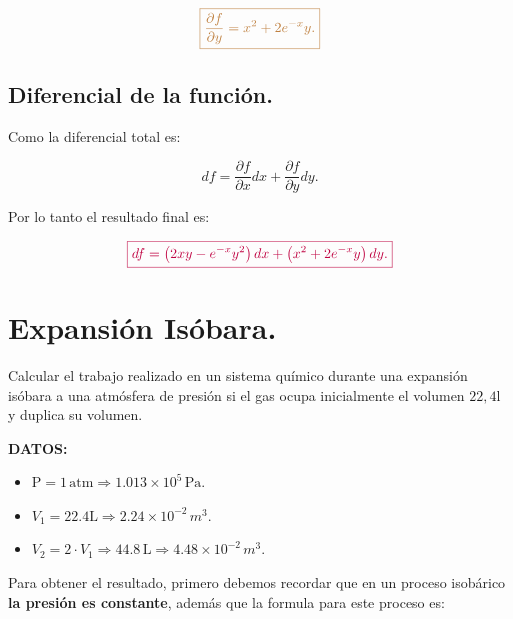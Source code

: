 \documentclass[a4paper,12pt]{article} %
\begin{document}
\vspace{\baselineskip}

\[ \textcolor{brown}{\boxed{ \frac{\partial f}{\partial y} = x^2 + 2 e^{-x}y. }} \]


\subsection{ Diferencial de la función. }

\begin{justify}
	Como la diferencial total es:
\end{justify}

\[ df = \frac{\partial f}{\partial x}dx + \frac{\partial f}{\partial y}dy .\]

\begin{justify}
	Por lo tanto el resultado final es:
\end{justify}

\[ \textcolor{purple}{\boxed{ df = \left( 2xy - e^{-x} y^2 \right) dx + \left( x^2 + 2 e^{-x} y \right) dy . }} \]

\section{Expansión Isóbara.}

\begin{justify}
	Calcular el trabajo realizado en un sistema químico durante una expansión isóbara a una atmósfera de presión si el gas ocupa inicialmente el volumen \(22,4 \mathrm{l}\) y duplica su volumen.
\end{justify}

\begin{justify}
	\textbf{DATOS:}
\end{justify}

\begin{itemize}
	\item \( \mathrm{P} = 1 \, \mathrm{atm} \Rightarrow 1.013 \times 10^5 \, \mathrm{Pa}. \)
	\item \( V_1 = 22.4 \mathrm{L} \Rightarrow 2.24 \times 10^{-2} \, m^3 .\)
	\item \( V_2 = 2 \cdot V_1 \Rightarrow 44.8 \, \mathrm{L} \Rightarrow 4.48 \times 10^{-2}\, m^3. \)
\end{itemize}

\begin{justify}
	Para obtener el resultado, primero debemos recordar que en un proceso isobárico \textbf{la presión es constante}, además que la formula para este proceso es:
\end{justify}
\end{document}
